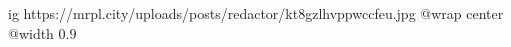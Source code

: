  
 
 
 
 

\ifcmt
  ig https://mrpl.city/uploads/posts/redactor/kt8gzlhvppwccfeu.jpg
  @wrap center
  @width 0.9
\fi
